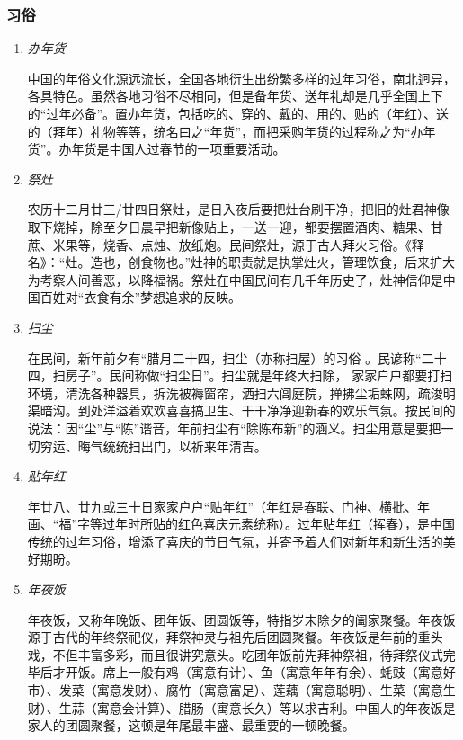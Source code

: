 \subsubsection{习俗}

\begin{enumerate}
    
\item \emph{办年货}

中国的年俗文化源远流长，全国各地衍生出纷繁多样的过年习俗，南北迥异，各具特色。虽然各地习俗不尽相同，但是备年货、送年礼却是几乎全国上下的“过年必备”。置办年货，包括吃的、穿的、戴的、用的、贴的（年红）、送的（拜年）礼物等等，统名曰之“年货”，而把采购年货的过程称之为“办年货”。办年货是中国人过春节的一项重要活动。

\item \emph{祭灶}

农历十二月廿三/廿四日祭灶，是日入夜后要把灶台刷干净，把旧的灶君神像取下烧掉，除至夕日晨早把新像贴上，一送一迎，都要摆置酒肉、糖果、甘蔗、米果等，烧香、点烛、放纸炮。民间祭灶，源于古人拜火习俗。《释名》：“灶。造也，创食物也。”灶神的职责就是执掌灶火，管理饮食，后来扩大为考察人间善恶，以降福祸。祭灶在中国民间有几千年历史了，灶神信仰是中国百姓对“衣食有余”梦想追求的反映。

\item  \emph{扫尘}

在民间，新年前夕有“腊月二十四，扫尘（亦称扫屋）的习俗 。民谚称“二十四，扫房子”。民间称做“扫尘日”。扫尘就是年终大扫除， 家家户户都要打扫环境，清洗各种器具，拆洗被褥窗帘，洒扫六闾庭院，掸拂尘垢蛛网，疏浚明渠暗沟。到处洋溢着欢欢喜喜搞卫生、干干净净迎新春的欢乐气氛。按民间的说法：因“尘”与“陈”谐音，年前扫尘有“除陈布新”的涵义。扫尘用意是要把一切穷运、晦气统统扫出门，以祈来年清吉。

\item \emph{贴年红}

年廿八、廿九或三十日家家户户“贴年红”（年红是春联、门神、横批、年画、“福”字等过年时所贴的红色喜庆元素统称）。过年贴年红（挥春），是中国传统的过年习俗，增添了喜庆的节日气氛，并寄予着人们对新年和新生活的美好期盼。

\item \emph{年夜饭}

年夜饭，又称年晚饭、团年饭、团圆饭等，特指岁末除夕的阖家聚餐。年夜饭源于古代的年终祭祀仪，拜祭神灵与祖先后团圆聚餐。年夜饭是年前的重头戏，不但丰富多彩，而且很讲究意头。吃团年饭前先拜神祭祖，待拜祭仪式完毕后才开饭。席上一般有鸡（寓意有计）、鱼（寓意年年有余）、蚝豉（寓意好市）、发菜（寓意发财）、腐竹（寓意富足）、莲藕（寓意聪明）、生菜（寓意生财）、生蒜（寓意会计算）、腊肠（寓意长久）等以求吉利。中国人的年夜饭是家人的团圆聚餐，这顿是年尾最丰盛、最重要的一顿晚餐。


\end{enumerate}
